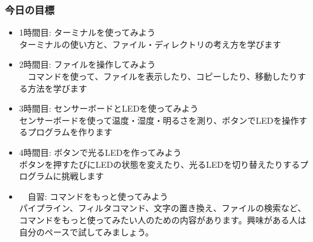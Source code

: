 \documentclass[slide03.tex]{subfiles}
\begin{document}
\begin{frame}
    \frametitle{今日の目標}
    \begin{itemize}
        \item 1時間目: ターミナルを使ってみよう\\
        {\footnotesize ターミナルの使い方と、ファイル・ディレクトリの考え方を学びます\\}
        \item 2時間目: ファイルを操作してみよう\\
        {\footnotesize　コマンドを使って、ファイルを表示したり、コピーしたり、移動したりする方法を学びます\\}
        \item 3時間目: センサーボードとLEDを使ってみよう\\
        {\footnotesize センサーボードを使って温度・湿度・明るさを測り、ボタンでLEDを操作するプログラムを作ります\\}
        \item 4時間目: ボタンで光るLEDを作ってみよう\\
        {\footnotesize ボタンを押すたびにLEDの状態を変えたり、光るLEDを切り替えたりするプログラムに挑戦します\\}
        \item　自習: コマンドをもっと使ってみよう\\
        {\footnotesize パイプライン、フィルタコマンド、文字の置き換え、ファイルの検索など、コマンドをもっと使ってみたい人のための内容があります。興味がある人は自分のペースで試してみましょう。\\}
    \end{itemize}
\end{frame}

\end{document}
